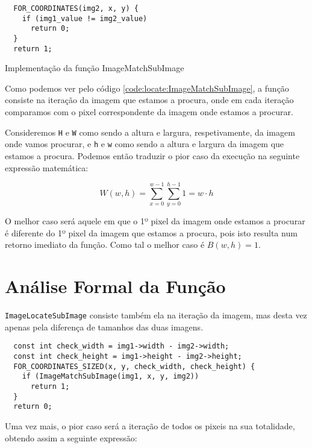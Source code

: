 \begin{listing}[H]
	\centering
	\begin{verbatim}
  FOR_COORDINATES(img2, x, y) {
    if (img1_value != img2_value)
      return 0;
  }
  return 1;
  \end{verbatim}
	\caption{Implementação da função ImageMatchSubImage}
	\label{code:locate:ImageMatchSubImage}
\end{listing}

Como podemos ver pelo código \ref{code:locate:ImageMatchSubImage}, a função
consiste na iteração da imagem que estamos a procura, onde em cada iteração
comparamos com o pixel correspondente da imagem onde estamos a procurar.

Consideremos \verb|H| e \verb|W| como sendo a altura e largura, respetivamente,
da imagem onde vamos procurar, e \verb|h| e \verb|w| como sendo a altura e
largura da imagem que estamos a procura. Podemos então traduzir o pior caso da
execução na seguinte expressão matemática:

\begin{equation}
	W(w,h) = \sum_{x = 0}^{w - 1} \sum_{y = 0}^{h -1} 1 = w \cdot h
\end{equation}

O melhor caso será aquele em que o 1º pixel da imagem onde estamos a procurar é
diferente do 1º pixel da imagem que estamos a procura, pois isto resulta num
retorno imediato da função. Como tal o melhor caso é $B(w,h) = 1$.


\section{Análise Formal da Função }

\Verb|ImageLocateSubImage| consiste também ela na iteração da imagem, mas desta
vez apenas pela diferença de tamanhos das duas imagens.

\begin{listing}[H]
	\centering
	\begin{verbatim}
  const int check_width = img1->width - img2->width;
  const int check_height = img1->height - img2->height;
  FOR_COORDINATES_SIZED(x, y, check_width, check_height) {
    if (ImageMatchSubImage(img1, x, y, img2))
      return 1;
  }
  return 0;
  \end{verbatim}
\end{listing}

Uma vez mais, o pior caso será a iteração de todos os pixeis na sua totalidade,
obtendo assim a seguinte expressão:

